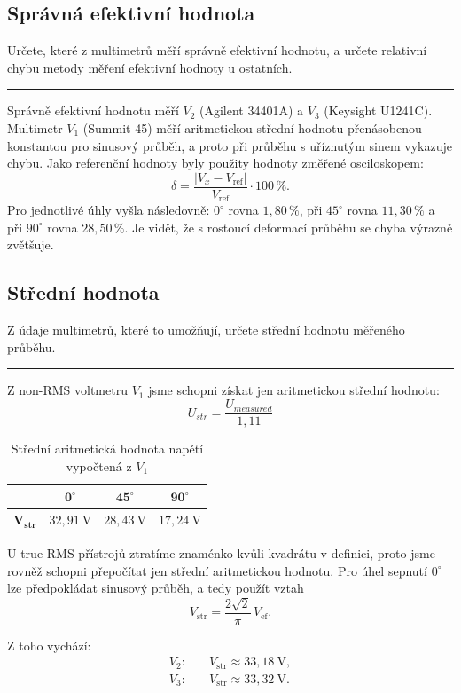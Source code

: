 \documentclass[a4paper,12pt]{article}
\begin{document}
\subsection{Správná efektivní hodnota}
Určete, které z multimetrů měří správně efektivní hodnotu, a určete relativní chybu metody měření efektivní hodnoty u ostatních.
\par\noindent\rule{\textwidth}{0.4pt}
Správně efektivní hodnotu měří $V_2$ (Agilent 34401A) a $V_3$ (Keysight U1241C). Multimetr $V_1$ (Summit 45) měří aritmetickou střední hodnotu přenásobenou konstantou pro sinusový průběh, a proto při průběhu s uříznutým sinem vykazuje chybu. 
Jako referenční hodnoty byly použity hodnoty změřené osciloskopem:
$$
\delta = \frac{|V_x - V_{\mathrm{ref}}|}{V_{\mathrm{ref}}}\cdot 100\,\%.
$$
Pro jednotlivé úhly vyšla následovně: $0^\circ$ rovna $1{,}80\,\%$, při $45^\circ$ rovna $11{,}30\,\%$ a při $90^\circ$ rovna $28{,}50\,\%$. Je vidět, že s rostoucí deformací průběhu se chyba výrazně zvětšuje.

\subsection{Střední hodnota}
Z údaje multimetrů, které to umožňují, určete střední hodnotu měřeného průběhu.
\par\noindent\rule{\textwidth}{0.4pt}

Z non-RMS voltmetru $V_1$ jsme schopni získat jen aritmetickou střední hodnotu:
$$
U_{str} = \frac{U_{measured}}{1,11}
$$

\begin{table}[H]
\centering
\begin{tabular}{|c|c|c|c|}
\hline
 & $\mathbf{0^\circ}$ & $\mathbf{45^\circ}$ & $\mathbf{90^\circ}$ \\
\hline
$\mathbf{V_{str}}$ & $32{,}91\ \mathrm{V}$ & $28{,}43\ \mathrm{V}$ & $17{,}24\ \mathrm{V}$ \\
\hline
\end{tabular}
\caption{Střední aritmetická hodnota napětí vypočtená z $V_1$}
\end{table}

U true-RMS přístrojů ztratíme znaménko kvůli kvadrátu v definici, proto jsme rovněž schopni přepočítat jen střední aritmetickou hodnotu.
Pro úhel sepnutí $0^\circ$ lze předpokládat sinusový průběh, a tedy použít vztah
$$
V_{\mathrm{str}} = \frac{2\sqrt{2}}{\pi} \, V_{\mathrm{ef}}.
$$

Z toho vychází:
$$
\begin{aligned}
V_2: \quad & V_{\mathrm{str}} \approx 33{,}18\ \mathrm{V}, \\
V_3: \quad & V_{\mathrm{str}} \approx 33{,}32\ \mathrm{V}.
\end{aligned}
$$
\end{document}
